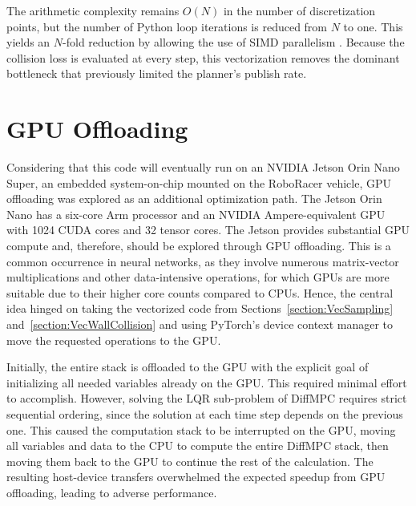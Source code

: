 The arithmetic complexity remains $O(N)$ in the number of discretization points, but the number of Python loop iterations is reduced from $N$ to one.
This yields an $N$-fold reduction by allowing the use of SIMD parallelism \cite{flynn_ComputerOrganizationsTheir_1972, paszke_PyTorchImperativeStyle_2019}.
Because the collision loss is evaluated at every step, this vectorization removes the dominant bottleneck that previously limited the planner's publish rate.

\section{GPU Offloading}
\label{section:GPUOffloading}

Considering that this code will eventually run on an NVIDIA Jetson Orin Nano Super, an embedded system-on-chip mounted on the RoboRacer vehicle, GPU offloading was explored as an additional optimization path.
The Jetson Orin Nano has a six-core Arm processor and an NVIDIA Ampere-equivalent GPU with 1024 CUDA cores and 32 tensor cores.
The Jetson provides substantial GPU compute and, therefore, should be explored through GPU offloading.
This is a common occurrence in neural networks, as they involve numerous matrix-vector multiplications and other data-intensive operations, for which GPUs are more suitable due to their higher core counts compared to CPUs.
Hence, the central idea hinged on taking the vectorized code from Sections~\ref{section:VecSampling} and~\ref{section:VecWallCollision} and using PyTorch's device context manager to move the requested operations to the GPU.

Initially, the entire stack is offloaded to the GPU with the explicit goal of initializing all needed variables already on the GPU.
This required minimal effort to accomplish.
However, solving the LQR sub-problem of DiffMPC requires strict sequential ordering, since the solution at each time step depends on the previous one.
This caused the computation stack to be interrupted on the GPU, moving all variables and data to the CPU to compute the entire DiffMPC stack, then moving them back to the GPU to continue the rest of the calculation.
The resulting host-device transfers overwhelmed the expected speedup from GPU offloading, leading to adverse performance.

